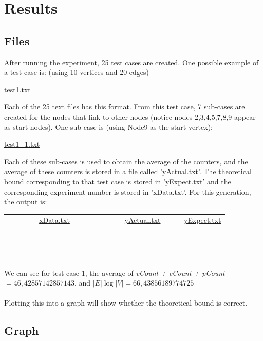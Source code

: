 \documentclass{assignment}
\begin{document}
\section{Results}
\subsection{Files}
After running the experiment, 25 test cases are created. One possible example of a test case is: (using 10 vertices and 20 edges) 
\begin{center}
    \underline{test1.txt} \\
     
\end{center}
Each of the 25 text files has this format. From this test case, 7 sub-cases are created for the nodes that link to other nodes (notice nodes 2,3,4,5,7,8,9 appear as start nodes). One sub-case is (using Node9 as the start vertex):
\begin{center}
    \underline{test1\_1.txt} \\
     
\end{center}
Each of these sub-cases is used to obtain the average of the counters, and the average of these counters is stored in a file called 'yActual.txt'. The theoretical bound corresponding to that test case is stored in 'yExpect.txt' and the corresponding experiment number is stored in 'xData.txt'. For this generation, the output is: \\
\begin{tabular}{ccc}
    \underline{xData.txt} & \underline{yActual.txt} & \underline{yExpect.txt} \\
     ~~~~~~~~~~~~~~~~~~~~~~~~~~&
     ~~~~~~~~~~~~~~~~~~~&
     \\
     
\end{tabular} \\ ~\\ We can see for test case 1, the average of \textit{vCount + eCount + pCount} $= 46,42857142857143$, and $|E| \log |V| = 66,43856189774725$ \\ ~\\
Plotting this into a graph will show whether the theoretical bound is correct. \\
\subsection{Graph}
\end{document}
